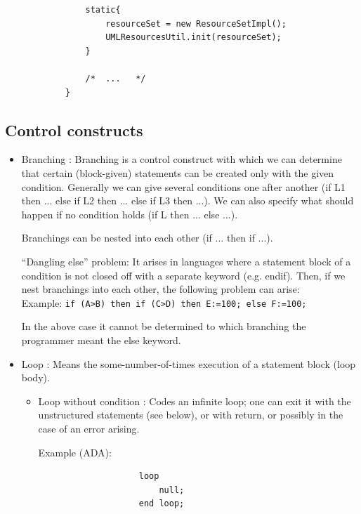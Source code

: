 \documentclass[margin=0px]{article}
\begin{document}
\begin{itemize}
\begin{itemize}
\begin{verbatim}
                static{
                    resourceSet = new ResourceSetImpl();
                    UMLResourcesUtil.init(resourceSet);
                }

                /*  ...   */
            }
            \end{verbatim}

          \end{itemize}

\end{itemize}

\subsection{Control constructs}

\begin{itemize}
    \item	Branching : Branching is a control construct with which we can determine that certain
          (block-given) statements can be created only with the given condition.
          Generally we can give several conditions one after another (if L1 then ... else if L2 then ... else if L3 then ...).
          We can also specify what should happen if no condition holds (if L then ... else ...).

          Branchings can be nested into each other (if ... then if ...).

          ``Dangling else'' problem: It arises in languages where a statement block of a
          condition is not closed off with a separate keyword (e.g. endif). Then, if we nest branchings into each other, the following
          problem can arise:\\
          Example: \texttt{if (A>B) then if (C>D) then E:=100; else F:=100;}

          In the above case it cannot be determined to which branching the programmer meant the else keyword.

    \item	Loop : Means the some-number-of-times execution of a statement block (loop body).
          \begin{itemize}
              \item	Loop without condition : Codes an infinite loop; one can exit it with the unstructured statements
                    (see below), or with return, or possibly in the case of an error arising.

                    Example (ADA):
                    \begin{verbatim}
                    loop
                        null;
                    end loop;
                \end{verbatim}


\end{itemize}
\end{itemize}
\end{document}
